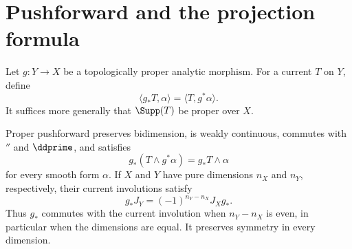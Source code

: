 \section{Pushforward and the projection formula}
\label{sec:ch14-pushforward}

Let $g:Y\to X$ be a topologically proper analytic morphism.  For a current $T$ on $Y$, define
\[
                  \langle g_*T,\alpha\rangle
                    =\langle T,g^*\alpha\rangle.
\]
It suffices more generally that $\Supp(T)$ be proper over $X$.

\begin{proposition}
\label{prop:current-pushforward-formal}
Proper pushforward preserves bidimension, is weakly continuous, commutes
with $\dprime$ and $\ddprime$, and satisfies
\[
              g_*(T\wedge g^*\alpha)=g_*T\wedge\alpha
\]
for every smooth form $\alpha$.  If $X$ and $Y$ have pure dimensions
$n_X$ and $n_Y$, respectively, their current involutions satisfy
\[
                 g_*J_Y=(-1)^{n_Y-n_X}J_Xg_* .
\]
Thus $g_*$ commutes with the current involution when $n_Y-n_X$ is even,
in particular when the dimensions are equal.  It preserves symmetry
in every dimension.
\end{proposition}
